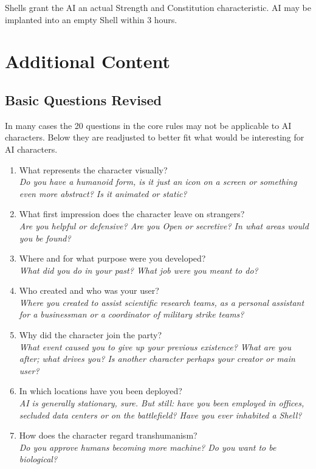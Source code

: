 \documentclass[12pt,a4paper,openany]{book}
\begin{document}
	Shells grant the AI an actual Strength and Constitution characteristic. AI may be implanted into an empty Shell within 3 hours.

	\chapter{Additional Content}
	\section{Basic Questions Revised}
	In many cases the 20 questions in the core rules may not be applicable to AI characters. Below they are readjusted to better fit what would be interesting for AI characters.
	\begin{enumerate}
		\setlength\itemsep{-6mm}
		\item What represents the character visually?\\
		\textit{Do you have a humanoid form, is it just an icon on a screen or something even more abstract? Is it animated or static?}
		\item What first impression does the character leave on strangers?\\
		\textit{Are you helpful or defensive? Are you Open or secretive? In what areas would you be found?}
		\item Where and for what purpose were you developed?\\
		\textit{What did you do in your past? What job were you meant to do?}
		\item Who created and who was your user?\\
		\textit{Where you created to assist scientific research teams, as a personal assistant for a businessman or a coordinator of military strike teams?}
		\item Why did the character join the party?\\
		\textit{What event caused you to give up your previous existence? What are you after; what drives you? Is another character perhaps your creator or main user?}
		\item In which locations have you been deployed?\\
		\textit{AI is generally stationary, sure. But still: have you been employed in offices, secluded data centers or on the battlefield? Have you ever inhabited a Shell?}
		\item How does the character regard transhumanism?\\
		\textit{Do you approve humans becoming more machine? Do you want to be biological?}

\end{enumerate}
\end{document}
